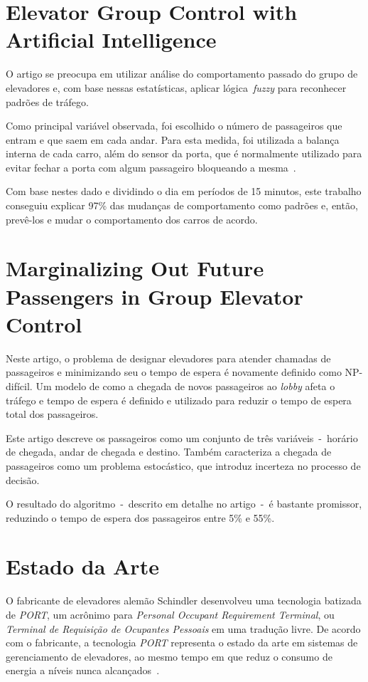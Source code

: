 \section{\label{section:marja}Elevator Group Control with Artificial
Intelligence~\cite{marja97}}

O artigo  se preocupa em utilizar análise do comportamento passado do grupo de
elevadores e, com base nessas estatísticas, aplicar lógica~\textit{fuzzy} para
reconhecer padrões de tráfego.

Como principal variável observada, foi escolhido o número de passageiros que
entram e que saem em cada andar. Para esta medida, foi utilizada a balança
interna de cada carro, além do sensor da porta, que é normalmente utilizado para
evitar fechar a porta com algum passageiro bloqueando a mesma~\cite{marja97}.

Com base nestes dado e dividindo o dia em períodos de 15 minutos, este trabalho
conseguiu explicar 97\% das mudanças de comportamento como padrões e, então,
prevê-los e mudar o comportamento dos carros de acordo.

\section{\label{section:dblp}Marginalizing Out Future Passengers in Group
Elevator Control~\cite{DBLP:journals/corr/abs-1212-2499}}

Neste artigo, o problema de designar elevadores para atender chamadas de
passageiros e minimizando seu o tempo de espera é novamente definido como
NP-difícil. Um modelo de como a chegada de novos passageiros ao \textit{lobby}
afeta o tráfego e tempo de espera é definido e utilizado para reduzir o tempo de
espera total dos passageiros.

Este artigo descreve os passageiros como um conjunto de três variáveis~-~horário
de chegada, andar de chegada e destino. Também caracteriza a chegada de
passageiros como um problema estocástico, que introduz incerteza no processo de
decisão.

O resultado do algoritmo~-~descrito em detalhe no artigo~-~é bastante
promissor, reduzindo o tempo de espera dos passageiros entre 5\% e 55\%.

\section{\label{section:art}Estado da Arte}

O fabricante de elevadores alemão Schindler desenvolveu uma tecnologia batizada
de \textit{PORT}, um acrônimo para \textit{Personal Occupant Requirement
Terminal}, ou \textit{Terminal de Requisição de Ocupantes Pessoais} em uma
tradução livre. De acordo com o fabricante, a tecnologia \textit{PORT}
representa o estado da arte em sistemas de gerenciamento de elevadores, ao mesmo
tempo em que reduz o consumo de energia a níveis nunca
alcançados~\cite{Schindler14}.

